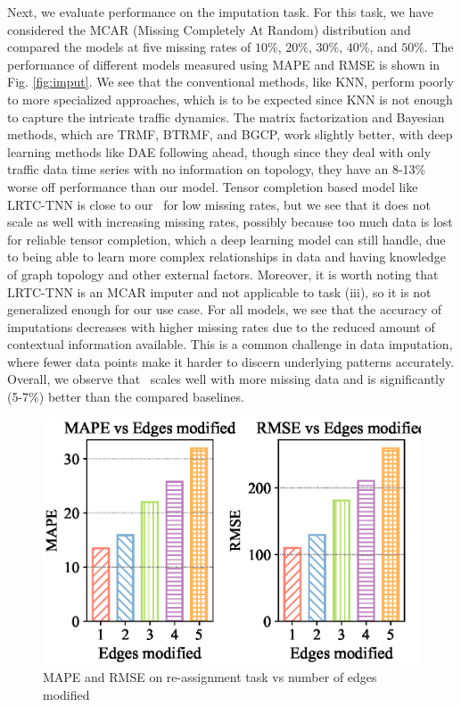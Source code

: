 Next, we evaluate performance on the imputation task. For this task, we have considered the MCAR (Missing Completely At Random) distribution and compared the models at five missing rates of $10\%$, $20\%$, $30\%$, $40\%$, and $50\%$. The performance of different models measured using MAPE and RMSE is shown in Fig. \ref{fig:imput}. We see that the conventional methods, like KNN, perform poorly to more specialized approaches, which is to be expected since KNN is not enough to capture the intricate traffic dynamics. The matrix factorization and Bayesian methods, which are TRMF, BTRMF, and BGCP, work slightly better, with deep learning methods like DAE following ahead, though since they deal with only traffic data time series with no information on topology, they have an 8-13\% worse off performance than our model. Tensor completion based model like LRTC-TNN is close to our \name\ for low missing rates, but we see that it does not scale as well with increasing missing rates, possibly because too much data is lost for reliable tensor completion, which a deep learning model can still handle, due to being able to learn more complex relationships in data and having knowledge of graph topology and other external factors. Moreover, it is worth noting that LRTC-TNN is an MCAR imputer and not applicable to task (iii), so it is not generalized enough for our use case. For all models, we see that the accuracy of imputations decreases with higher missing rates due to the reduced amount of contextual information available. This is a common challenge in data imputation, where fewer data points make it harder to discern underlying patterns accurately. Overall, we observe that \name\ scales well with more missing data and is significantly (5-7\%) better than the compared baselines.


\begin{figure}[t]
  \centering
  \includegraphics[width=\linewidth]{modif.eps}
  \caption{MAPE and RMSE on re-assignment task vs number of edges modified}
  \label{fig:edge_modif}
\end{figure}

